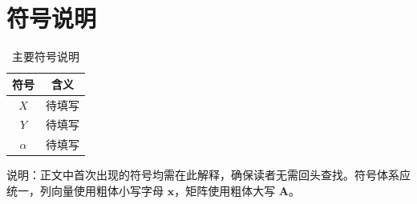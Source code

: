 \section{符号说明}\label{sec:notation}

\begin{table}[htbp]
    \centering
    \caption{主要符号说明}
    \label{tab:notation}
    \begin{tabular}{cc}
        \toprule
        符号 & 含义 \\
        \midrule
        $X$ & 待填写 \\
        $Y$ & 待填写 \\
        $\alpha$ & 待填写 \\
        \bottomrule
    \end{tabular}
\end{table}

说明：正文中首次出现的符号均需在此解释，确保读者无需回头查找。符号体系应统一，列向量使用粗体小写字母 $\bm{x}$，矩阵使用粗体大写 $\bm{A}$。
